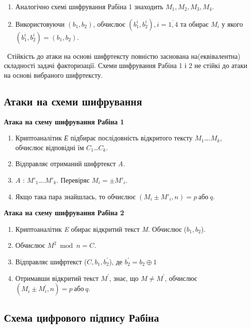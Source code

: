\begin{enumerate}
        \item  Аналогічно схемі шифрування Рабіна 1 знаходить ${M_1,M_2,M_3,M_4}$.
        \item Використовуючи $(b_1,b_2)$,  обчислює $ (b^i_1, b^i_2) , i=\overline{1,4}$ та обирає $M_i$ у якого $(b^i_1, b^i_2)= (b_1,b_2)$.    
\end{enumerate}
\ Стійкість до атаки на основі шифртексту повністю заснована на(еквівалентна) складності задачі факторизації. Схеми шифрування Рабіна 1 і 2 не стійкі до атаки на основі вибраного шифртексту.

\subsection{Атаки на схеми шифрування}
\begin{center}
\textbf{Атака на схему шифрування Рабіна 1}
\end{center}

\begin{enumerate}
        \item Криптоаналітик \textsl{Е} підбирає послідовність
        відкритого тексту $M_1$….$M_k$, обчислює відповідні їм  $C_1$…$C_k$.
        \item Відправляє отриманий шифртекст \textsl{A}.
        \item  $A$ : $M'_1$….$M'_k$. Перевіряє $M_i=\pm M'_i$.
        \item Якщо така пара знайшлась, то обчислює $\left(M_i\pm M'_i,n\right)=p \: \text{або} \:q$.     
\end{enumerate}

\begin{center}
\textbf{Атака на схему шифрування Рабіна 2}
\end{center}

\begin{enumerate}
        \item  Криптоаналітик \textsl{E} обирає відкритий текст \textsl{M}. Обчислює ($b_1,b_2$).
        \item Обчислює $M^2\bmod n=C$.
        \item Відправляє шифртекст ($C, b_1,b^{'}_2$), де $b^{'}_2=b_2 \oplus 1$
        \item Отримавши відкритий текст $M^{'}$, знає, що $M\ne M^{'}$, обчислює $\left(M_i\pm M^{'}_i,n\right)=p \: \text{або} \: q$.
\end{enumerate}


\subsection{Схема цифрового підпису Рабіна}

